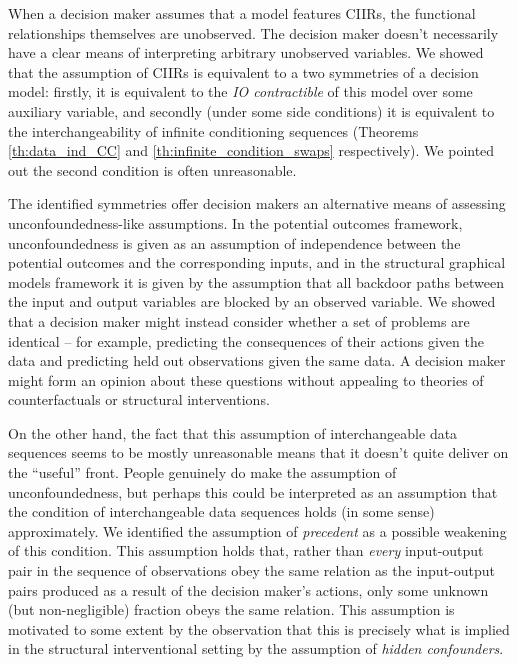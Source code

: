 When a decision maker assumes that a model features CIIRs, the functional relationships themselves are unobserved. The decision maker doesn't necessarily have a clear means of interpreting arbitrary unobserved variables. We showed that the assumption of CIIRs is equivalent to a two symmetries of a decision model: firstly, it is equivalent to the \emph{IO contractible} of this model over some auxiliary variable, and secondly (under some side conditions) it is equivalent to the interchangeability of infinite conditioning sequences (Theorems \ref{th:data_ind_CC} and \ref{th:infinite_condition_swaps} respectively). We pointed out the second condition is often unreasonable.

The identified symmetries offer decision makers an alternative means of assessing unconfoundedness-like assumptions. In the potential outcomes framework, unconfoundedness is given as an assumption of independence between the potential outcomes and the corresponding inputs, and in the structural graphical models framework it is given by the assumption that all backdoor paths between the input and output variables are blocked by an observed variable. We showed that a decision maker might instead consider whether a set of problems are identical -- for example, predicting the consequences of their actions given the data and predicting held out observations given the same data. A decision maker might form an opinion about these questions without appealing to theories of counterfactuals or structural interventions.

On the other hand, the fact that this assumption of interchangeable data sequences seems to be mostly unreasonable means that it doesn't quite deliver on the ``useful'' front. People genuinely do make the assumption of unconfoundedness, but perhaps this could be interpreted as an assumption that the condition of interchangeable data sequences holds (in some sense) approximately. We identified the assumption of \emph{precedent} as a possible weakening of this condition. This assumption holds that, rather than \emph{every} input-output pair in the sequence of observations obey the same relation as the input-output pairs produced as a result of the decision maker's actions, only some unknown (but non-negligible) fraction obeys the same relation. This assumption is motivated to some extent by the observation that this is precisely what is implied in the structural interventional setting by the assumption of \emph{hidden confounders}.


